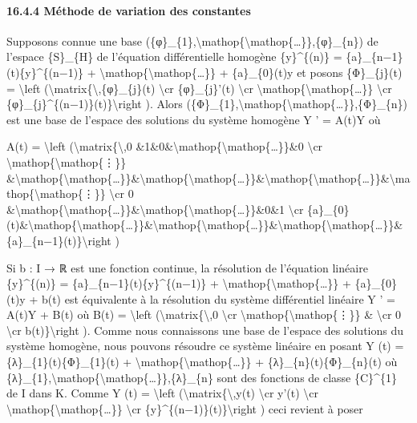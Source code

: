 \documentclass[]{article}
\begin{document}
\paragraph{16.4.4 Méthode de variation des constantes}

Supposons connue une base
(\{φ\}\_\{1\},\textbackslash{}mathop\{\textbackslash{}mathop\{\ldots{}\}\},\{φ\}\_\{n\})
de l'espace \{S\}\_\{H\} de l'équation différentielle homogène
\{y\}\^{}\{(n)\} = \{a\}\_\{n−1\}(t)\{y\}\^{}\{(n−1)\} +
\textbackslash{}mathop\{\textbackslash{}mathop\{\ldots{}\}\} +
\{a\}\_\{0\}(t)y et posons \{Φ\}\_\{j\}(t) = \textbackslash{}left
(\textbackslash{}matrix\{\textbackslash{},\{φ\}\_\{j\}(t)
\textbackslash{}cr \{φ\}\_\{j\}'(t) \textbackslash{}cr
\textbackslash{}mathop\{\textbackslash{}mathop\{\ldots{}\}\}
\textbackslash{}cr \{φ\}\_\{j\}\^{}\{(n−1)\}(t)\}\textbackslash{}right
). Alors
(\{Φ\}\_\{1\},\textbackslash{}mathop\{\textbackslash{}mathop\{\ldots{}\}\},\{Φ\}\_\{n\})
est une base de l'espace des solutions du système homogène Y ' = A(t)Y
où

A(t) = \textbackslash{}left (\textbackslash{}matrix\{\textbackslash{},0
\&1\&0\&\textbackslash{}mathop\{\textbackslash{}mathop\{\ldots{}\}\}\&0
\textbackslash{}cr \textbackslash{}mathop\{\textbackslash{}mathop\{⋮\}\}
\&\textbackslash{}mathop\{\textbackslash{}mathop\{\ldots{}\}\}\&\textbackslash{}mathop\{\textbackslash{}mathop\{\ldots{}\}\}\&\textbackslash{}mathop\{\textbackslash{}mathop\{\ldots{}\}\}\&\textbackslash{}mathop\{\textbackslash{}mathop\{⋮\}\}
\textbackslash{}cr 0
\&\textbackslash{}mathop\{\textbackslash{}mathop\{\ldots{}\}\}\&\textbackslash{}mathop\{\textbackslash{}mathop\{\ldots{}\}\}\&0\&1
\textbackslash{}cr
\{a\}\_\{0\}(t)\&\textbackslash{}mathop\{\textbackslash{}mathop\{\ldots{}\}\}\&\textbackslash{}mathop\{\textbackslash{}mathop\{\ldots{}\}\}\&\textbackslash{}mathop\{\textbackslash{}mathop\{\ldots{}\}\}\&\{a\}\_\{n−1\}(t)\}\textbackslash{}right
)

Si b : I → ℝ est une fonction continue, la résolution de l'équation
linéaire \{y\}\^{}\{(n)\} = \{a\}\_\{n−1\}(t)\{y\}\^{}\{(n−1)\} +
\textbackslash{}mathop\{\textbackslash{}mathop\{\ldots{}\}\} +
\{a\}\_\{0\}(t)y + b(t) est équivalente à la résolution du système
différentiel linéaire Y ' = A(t)Y + B(t) où B(t) = \textbackslash{}left
(\textbackslash{}matrix\{\textbackslash{},0 \textbackslash{}cr
\textbackslash{}mathop\{\textbackslash{}mathop\{⋮\}\} \&
\textbackslash{}cr 0 \textbackslash{}cr b(t)\}\textbackslash{}right ).
Comme nous connaissons une base de l'espace des solutions du système
homogène, nous pouvons résoudre ce système linéaire en posant Y (t) =
\{λ\}\_\{1\}(t)\{Φ\}\_\{1\}(t) +
\textbackslash{}mathop\{\textbackslash{}mathop\{\ldots{}\}\} +
\{λ\}\_\{n\}(t)\{Φ\}\_\{n\}(t) où
\{λ\}\_\{1\},\textbackslash{}mathop\{\textbackslash{}mathop\{\ldots{}\}\},\{λ\}\_\{n\}
sont des fonctions de classe \{C\}\^{}\{1\} de I dans K. Comme Y (t) =
\textbackslash{}left (\textbackslash{}matrix\{\textbackslash{},y(t)
\textbackslash{}cr y'(t) \textbackslash{}cr
\textbackslash{}mathop\{\textbackslash{}mathop\{\ldots{}\}\}
\textbackslash{}cr \{y\}\^{}\{(n−1)\}(t)\}\textbackslash{}right ) ceci
revient à poser
\end{document}
